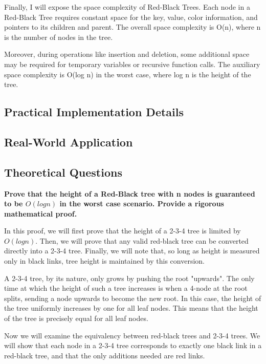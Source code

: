 \documentclass[12pt]{amsart}
\begin{document}
    Finally, I will expose the space complexity of Red-Black Trees.
    Each node in a Red-Black Tree requires constant space for the key, value, color information, and pointers to its children and parent. The overall space complexity is O(n), where n is the number of nodes in the tree.
    
    Moreover, during operations like insertion and deletion, some additional space may be required for temporary variables or recursive function calls.
    The auxiliary space complexity is O(log n) in the worst case, where log n is the height of the tree.

\subsection{Practical Implementation Details}

\subsection{Real-World Application}

\subsection{Theoretical Questions}

    \textbf{Prove that the height of a Red-Black tree with
    n nodes is guaranteed to be $O(log n)$ in the worst
    case scenario. Provide a rigorous mathematical proof.}
    
    In this proof, we will first prove that the height of a
    2-3-4 tree is limited by $O(log n)$. Then, we will prove
    that any valid red-black tree can be converted directly into
    a 2-3-4 tree. Finally, we will note that, so long as height
    is measured only in black links, tree height is maintained
    by this conversion.

    A 2-3-4 tree, by its nature, only grows by pushing the root
    "upwards". The only time at which the height of such a tree
    increases is when a 4-node at the root splits, sending a
    node upwards to become the new root. In this case, the
    height of the tree uniformly increases by one for all leaf
    nodes. This means that the height of the tree is precisely
    equal for all leaf nodes.

    Now we will examine the equivalency between red-black trees
    and 2-3-4 trees. We will show that each node in a 2-3-4 tree
    corresponds to exactly one black link in a red-black tree,
    and that the only additions needed are red links.
\end{document}
